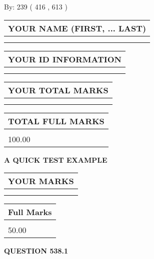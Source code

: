 \documentclass[12pt]{article}
\begin{document}
   
\hspace{1.0in} By: 
 239 ( 416 ,  613 )
   
   
   
   
\newpage 
\setcounter{page}{ 
   538001 } 
   
   
   
   
\noindent\begin{tabular}{|l|}
\hline
YOUR NAME (FIRST, ... LAST)  \\
\hline
 \\ 
 \\ 
\hline
\end{tabular}
\hspace{0.05in} \begin{tabular}{|l|}
\hline
 YOUR   ID   INFORMATION  \\
\hline
 \\ 
 \\ 
\hline
\end{tabular}
   
   
\vspace{0.2in}\noindent\begin{tabular}{|l|}
\hline
YOUR TOTAL MARKS  \\
\hline
 \\ 
 \\ 
\hline
\end{tabular}
\hspace{0.05in} \begin{tabular}{|l|}
\hline
TOTAL FULL MARKS  \\
\hline
 \\ 
100.00 \\
\hline
\end{tabular}
   
   
 \vspace{0.2in}
{\LARGE {\textbf{ A QUICK TEST EXAMPLE}}}
   
   
  
\vspace{0.2in}
  
\noindent\begin{tabular}{|l|}
\hline
 YOUR MARKS  \\
\hline
 \\ 
 \\ 
\hline
\end{tabular}
\hspace{0.05in} \begin{tabular}{|l|}
\hline
 Full Marks  \\
\hline
 \\ 
50.00 \\
\hline
\end{tabular}
{\textbf{\Large{QUESTION
538.1 
}}}
  
\end{document}
